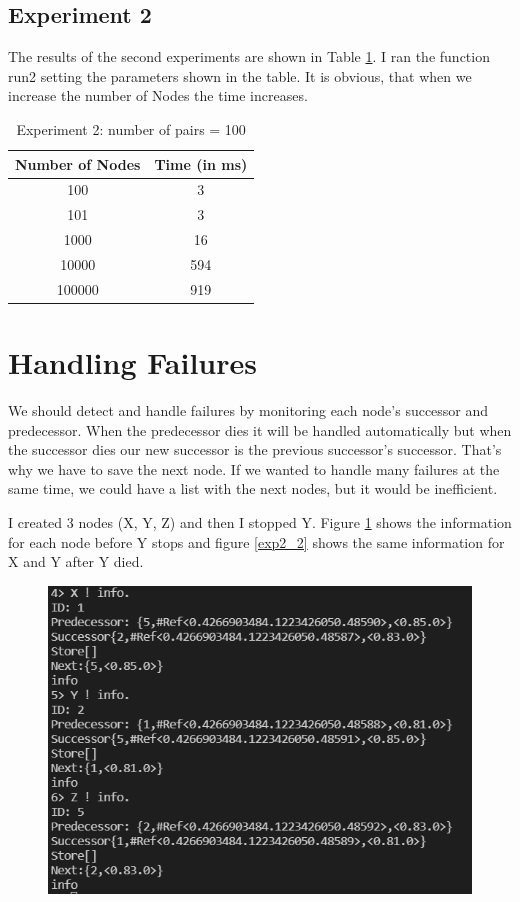 \documentclass[a4paper, 11pt]{article}
\begin{document}
\subsection{Experiment 2}
The results of the second experiments are shown in Table \ref{table:1}. I ran the function run2 setting the parameters shown in the table. It is obvious, that when we increase the number of Nodes the time increases.

\begin{table}[h!]
\centering
\begin{tabular}{ c c }
 Number of Nodes & Time (in ms)  \\ 
 \hline
 100 & 3  \\  
 101 & 3 \\
 1000 & 16 \\
 10000 & 594 \\
 100000 & 919
\end{tabular}
\caption{Experiment 2: number of pairs =  100}
\label{table:1}
\end{table}

\section{Handling Failures}
We should detect and handle failures by monitoring each node's successor and predecessor. When the predecessor dies it will be handled automatically but when the successor dies our new successor is the previous successor's successor. That's why we have to save the next node. If we wanted to handle many failures at the same time, we could have a list with the next nodes, but it would be inefficient.

I created 3 nodes (X, Y, Z) and then I stopped Y. Figure \ref{exp2_1} shows the information for each node before Y stops and figure \ref{exp2_2} shows the same information for X and Y after Y died.
\begin{figure}
  \begin{center}
    \includegraphics[scale=0.4]{exp2_1.PNG}
    \caption{}
    \label{exp2_1}
  \end{center}
\end{figure}
\end{document}
